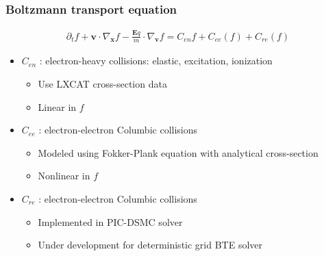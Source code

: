 \documentclass[mathserif, aspectratio=169]{beamer}
\newcommand{\vect}[1]{\boldsymbol{#1}}
\newcommand{\myint}{\int\limits}
\newcommand{\diff}[1]{\, d#1}
\begin{document}
\begin{frame}
	\frametitle{Boltzmann transport equation}
	\begin{align}
		\partial_t f  + \vect{v} \cdot \nabla_{\vect{x}} f -\frac{\vect{E} q}{m} \cdot \nabla_{\vect{v }}f = C_{en}f + C_{ee}(f) + C_{re}(f)
	\end{align}
	\begin{itemize}
		\item $C_{en}$ : electron-heavy collisions: elastic, excitation, ionization
		\begin{itemize}
			\item Use LXCAT cross-section data 
			\item Linear in $f$
		\end{itemize} 
		\item $C_{ee}$ : electron-electron Columbic collisions 
		\begin{itemize}
			\item Modeled using Fokker-Plank equation with analytical cross-section
			\item Nonlinear in $f$
		\end{itemize}
		\item $C_{re}$ : electron-electron Columbic collisions 
		\begin{itemize}
			\item Implemented in PIC-DSMC solver
			\item Under development for deterministic grid BTE solver
		\end{itemize}
	\end{itemize}
\end{frame}
\end{document}
